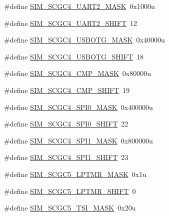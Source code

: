 \begin{DoxyCompactItemize}
\#define \hyperlink{group___s_i_m___register___masks_gaea7b7b8d6abc055026d4ca7299206597}{S\+I\+M\+\_\+\+S\+C\+G\+C4\+\_\+\+U\+A\+R\+T2\+\_\+\+M\+A\+SK}~0x1000u
\item 
\#define \hyperlink{group___s_i_m___register___masks_gae844b2ce3371466add7387b9ea32bc4c}{S\+I\+M\+\_\+\+S\+C\+G\+C4\+\_\+\+U\+A\+R\+T2\+\_\+\+S\+H\+I\+FT}~12
\item 
\#define \hyperlink{group___s_i_m___register___masks_ga136bfa98e3aafded899c9806d5410d4d}{S\+I\+M\+\_\+\+S\+C\+G\+C4\+\_\+\+U\+S\+B\+O\+T\+G\+\_\+\+M\+A\+SK}~0x40000u
\item 
\#define \hyperlink{group___s_i_m___register___masks_ga5d0dd9f68667fdf71fce1b0a6ae990dd}{S\+I\+M\+\_\+\+S\+C\+G\+C4\+\_\+\+U\+S\+B\+O\+T\+G\+\_\+\+S\+H\+I\+FT}~18
\item 
\#define \hyperlink{group___s_i_m___register___masks_gad7304bdb8fc46deb77c5e444e56fae40}{S\+I\+M\+\_\+\+S\+C\+G\+C4\+\_\+\+C\+M\+P\+\_\+\+M\+A\+SK}~0x80000u
\item 
\#define \hyperlink{group___s_i_m___register___masks_ga1072a5419bbeaf4081c6c4a5ca7cf86c}{S\+I\+M\+\_\+\+S\+C\+G\+C4\+\_\+\+C\+M\+P\+\_\+\+S\+H\+I\+FT}~19
\item 
\#define \hyperlink{group___s_i_m___register___masks_ga0b29e4c88f0494317c3cd447fb363f5e}{S\+I\+M\+\_\+\+S\+C\+G\+C4\+\_\+\+S\+P\+I0\+\_\+\+M\+A\+SK}~0x400000u
\item 
\#define \hyperlink{group___s_i_m___register___masks_ga4fd9f9a3ee78e060c7042597043c336c}{S\+I\+M\+\_\+\+S\+C\+G\+C4\+\_\+\+S\+P\+I0\+\_\+\+S\+H\+I\+FT}~22
\item 
\#define \hyperlink{group___s_i_m___register___masks_ga40dc8e1653911d8e12103bc4ef9d66d1}{S\+I\+M\+\_\+\+S\+C\+G\+C4\+\_\+\+S\+P\+I1\+\_\+\+M\+A\+SK}~0x800000u
\item 
\#define \hyperlink{group___s_i_m___register___masks_ga0bc6038c3a8a17fec28bc6980ad293e4}{S\+I\+M\+\_\+\+S\+C\+G\+C4\+\_\+\+S\+P\+I1\+\_\+\+S\+H\+I\+FT}~23
\item 
\#define \hyperlink{group___s_i_m___register___masks_ga6f63b73e0ad63163df381c795d583cc1}{S\+I\+M\+\_\+\+S\+C\+G\+C5\+\_\+\+L\+P\+T\+M\+R\+\_\+\+M\+A\+SK}~0x1u
\item 
\#define \hyperlink{group___s_i_m___register___masks_ga9b3669f3f4f380e18133785d6356c56c}{S\+I\+M\+\_\+\+S\+C\+G\+C5\+\_\+\+L\+P\+T\+M\+R\+\_\+\+S\+H\+I\+FT}~0
\item 
\#define \hyperlink{group___s_i_m___register___masks_ga12aa3509d85f1dddc69c48821f4f3225}{S\+I\+M\+\_\+\+S\+C\+G\+C5\+\_\+\+T\+S\+I\+\_\+\+M\+A\+SK}~0x20u

\end{DoxyCompactItemize}
